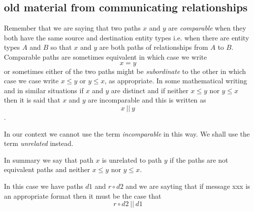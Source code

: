 \subsection{old material from communicating relationships}

\begin{notebox}
Remember that we are saying that two paths $x$ and $y$ are \textit{comparable} when they
both have the same source and destination entity types i.e. when there are entity types 
$A$ and $B$ so that $x$ and $y$ are both paths of relationships from $A$ to $B$.
Comparable paths are sometimes equivalent in which case we write
$$ x = y $$
or sometimes either of the two paths might be \textit{subordinate} to the other in which case we case write
$x \leq y$
or 
$y \leq x$, as appropriate.
In some mathematical writing and in similar situations if $x$ and $y$ are distinct and if neither  
$x \leq y$ nor $y \leq x$ then it is said that $x$ and $y$ are incomparable and this is written as
$$x\ ||\ y$$.

In our context we cannot use the term \textit{incomparable} in this way.
We shall use the term \textit{unrelated} instead.

In summary we say that path $x$ is unrelated to path $y$ if the paths are not equivalent paths
and neither $x \leq y$ nor $y \leq x$.

In this case we have paths $d1$ and $r \circ d2$ and we are sayting that if message xxx is an appropriate format then it must be the case that
\begin{equation}
r \circ d2\ ||\ d1
\end{equation}
\end{notebox}

